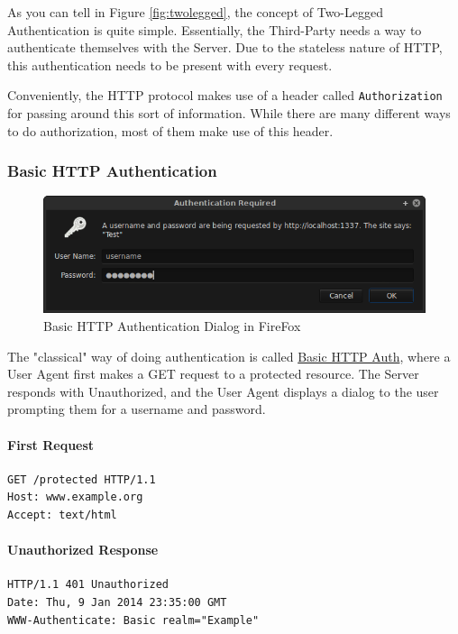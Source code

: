 \documentclass{book}
\begin{document}
As you can tell in Figure \ref{fig:twolegged}, the concept of Two-Legged Authentication is quite simple. Essentially, the Third-Party needs a way to authenticate themselves with the Server. Due to the stateless nature of HTTP, this authentication needs to be present with every request.

Conveniently, the HTTP protocol makes use of a header called \texttt{Authorization} for passing around this sort of information. While there are many different ways to do authorization, most of them make use of this header.

\subsubsection{Basic HTTP Authentication}

\begin{figure}[ht!]
\centering
\includegraphics[width=120mm]{images/basic-http-auth.png}
\caption{Basic HTTP Authentication Dialog in FireFox}
\label{fig:basichhtpauth}
\end{figure}

The "classical" way of doing authentication is called \href{https://tools.ietf.org/html/rfc2617}{Basic HTTP Auth}, where a User Agent first makes a GET request to a protected resource. The Server responds with Unauthorized, and the User Agent displays a dialog to the user prompting them for a username and password.

\paragraph{\textbf{First Request}}

\begin{verbatim}
GET /protected HTTP/1.1
Host: www.example.org
Accept: text/html
\end{verbatim}

\paragraph{\textbf{Unauthorized Response}}

\begin{verbatim}
HTTP/1.1 401 Unauthorized
Date: Thu, 9 Jan 2014 23:35:00 GMT
WWW-Authenticate: Basic realm="Example"
\end{verbatim}
\end{document}
